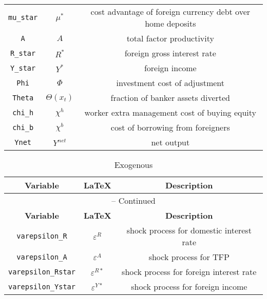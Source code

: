 \begin{center}
\begin{longtable}{ccc}
\texttt{mu\_star} & $\mu^{*}$ & cost advantage of foreign currency debt over home deposits\\
\texttt{A} & $A$ & total factor productivity\\
\texttt{R\_star} & $R^{*}$ & foreign gross interest rate\\
\texttt{Y\_star} & $Y^{*}$ & foreign income\\
\texttt{Phi} & $\Phi$ & investment cost of adjustment\\
\texttt{Theta} & $\Theta(x_{t})$ & fraction of banker assets diverted\\
\texttt{chi\_h} & $\chi^{h}$ & worker extra management cost of buying equity\\
\texttt{chi\_b} & $\chi^{b}$ & cost of borrowing from foreigners\\
\texttt{Ynet} & $Y^{net}$ & net output\\
\hline%
\end{longtable}
\end{center}
\begin{center}
\begin{longtable}{ccc}
\caption{Exogenous}\\%
\hline%
\multicolumn{1}{c}{\textbf{Variable}} &
\multicolumn{1}{c}{\textbf{\LaTeX}} &
\multicolumn{1}{c}{\textbf{Description}}\\%
\hline\hline%
\endfirsthead
\multicolumn{3}{c}{{\tablename} \thetable{} -- Continued}\\%
\hline%
\multicolumn{1}{c}{\textbf{Variable}} &
\multicolumn{1}{c}{\textbf{\LaTeX}} &
\multicolumn{1}{c}{\textbf{Description}}\\%
\hline\hline%
\endhead
\texttt{varepsilon\_R} & $\varepsilon^{R}$ & shock process for domestic interest rate\\
\texttt{varepsilon\_A} & $\varepsilon^{A}$ & shock process for TFP\\
\texttt{varepsilon\_Rstar} & $\varepsilon^{R*}$ & shock process for foreign interest rate\\
\texttt{varepsilon\_Ystar} & $\varepsilon^{Y*}$ & shock process for foreign income\\
\hline%
\end{longtable}
\end{center}
